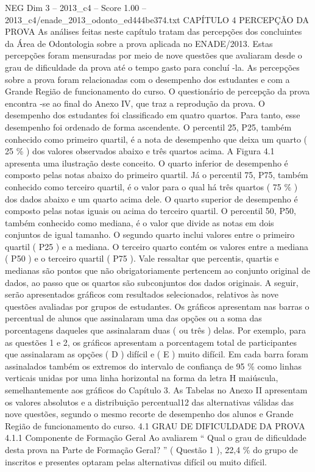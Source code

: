 \begin{textsample}{NEG Dim 3 – 2013\_c4 – Score 1.00 – 2013\_c4/enade\_2013\_odonto\_ed444be374.txt}  \label{ex:f3_neg_139}
CAPÍTULO 4 PERCEPÇÃO DA PROVA As análises feitas neste capítulo tratam das percepções dos concluintes da Área de Odontologia sobre a prova aplicada no ENADE/2013.
Estas percepções foram mensuradas por meio de nove questões que avaliaram desde o grau de dificuldade da prova até o tempo gasto para concluí -la.
As percepções sobre a prova foram relacionadas com o desempenho dos estudantes e com a Grande Região de funcionamento do curso.
O questionário de percepção da prova encontra -se ao final do Anexo IV, que traz a reprodução da prova.
O desempenho dos estudantes foi classificado em quatro quartos.
Para tanto, esse desempenho foi ordenado de forma ascendente.
O percentil 25, P25, também conhecido como primeiro quartil, é a nota de desempenho que deixa um quarto ( 25 \% ) dos valores observados abaixo e três quartos acima.
A Figura 4.1 apresenta uma ilustração deste conceito.
O quarto inferior de desempenho é composto pelas notas abaixo do primeiro quartil.
Já o percentil 75, P75, também conhecido como terceiro quartil, é o valor para o qual há três quartos ( 75 \% ) dos dados abaixo e um quarto acima dele.
O quarto superior de desempenho é composto pelas notas iguais ou acima do terceiro quartil.
O percentil 50, P50, também conhecido como mediana, é o valor que divide as notas em dois conjuntos de igual tamanho.
O segundo quarto inclui valores entre o primeiro quartil ( P25 ) e a mediana.
O terceiro quarto contém os valores entre a mediana ( P50 ) e o terceiro quartil ( P75 ).
Vale ressaltar que percentis, quartis e medianas são pontos que não obrigatoriamente pertencem ao conjunto original de dados, ao passo que os quartos são subconjuntos dos dados originais.
A seguir, serão apresentados gráficos com resultados selecionados, relativos às nove questões avaliadas por grupos de estudantes.
Os gráficos apresentam nas barras o percentual de alunos que assinalaram uma das opções ou a soma das porcentagens daqueles que assinalaram duas ( ou três ) delas.
Por exemplo, para as questões 1 e 2, os gráficos apresentam a porcentagem total de participantes que assinalaram as opções ( D ) difícil e ( E ) muito difícil.
Em cada barra foram assinalados também os extremos do intervalo de confiança de 95 \% como linhas verticais unidas por uma linha horizontal na forma da letra H maiúscula, semelhantemente aos gráficos do Capítulo 3.
As Tabelas no Anexo II apresentam os valores absolutos e a distribuição percentual12 das alternativas válidas das nove questões, segundo o mesmo recorte de desempenho dos alunos e Grande Região de funcionamento do curso. 4.1 GRAU DE DIFICULDADE DA PROVA 4.1.1 Componente de Formação Geral Ao avaliarem “ Qual o grau de dificuldade desta prova na Parte de Formação Geral? ” ( Questão 1 ), 22,4 \% do grupo de inscritos e presentes optaram pelas alternativas difícil ou muito difícil.

\end{textsample}
